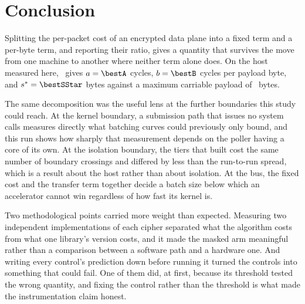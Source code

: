 \section{Conclusion}

Splitting the per-packet cost of an encrypted data plane into a fixed term and a
per-byte term, and reporting their ratio, gives a quantity that survives the
move from one machine to another where neither term alone does. On the host
measured here, \bestCipher\ gives $a = \bestA$ cycles, $b = \bestB$ cycles per
payload byte, and $s^{*} = \bestSStar$ bytes against a maximum carriable payload
of \protoMaxPayload\ bytes.

The same decomposition was the useful lens at the further boundaries this study
could reach. At the kernel boundary, a submission path that issues no system
calls measures directly what batching curves could previously only bound, and
this run shows how sharply that measurement depends on the poller having a core
of its own. At the isolation boundary, the tiers that built cost the same number
of boundary crossings and differed by less than the run-to-run spread, which is
a result about the host rather than about isolation. At the bus, the fixed cost
and the transfer term together decide a batch size below which an accelerator
cannot win regardless of how fast its kernel is.

Two methodological points carried more weight than expected. Measuring two
independent implementations of each cipher separated what the algorithm costs
from what one library's version costs, and it made the masked arm meaningful
rather than a comparison between a software path and a hardware one. And writing
every control's prediction down before running it turned the controls into
something that could fail. One of them did, at first, because its threshold
tested the wrong quantity, and fixing the control rather than the threshold is
what made the instrumentation claim honest.
